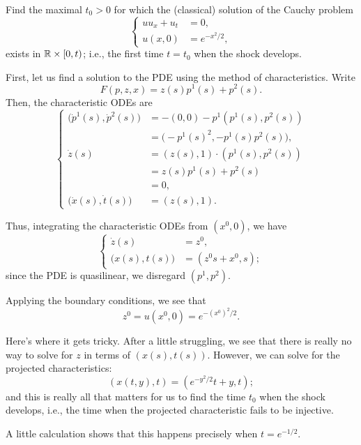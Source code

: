 \begin{problem}
  Find the maximal \(t_0>0\) for which the (classical) solution of the
  Cauchy problem
  \[
    \left\{
      \begin{aligned}
        uu_x+u_t&=0,\\
        u(x,0)&=e^{-x^2/2},
      \end{aligned}
    \right.
  \]
  exists in \(\mathbb{R}\times[0,t)\); i.e., the first time \(t=t_0\) when the
  shock develops.
\end{problem}
\begin{solution*}
  First, let us find a solution to the PDE using the method of
  characteristics. Write
  \[
    F(p,z,x)=z(s)p^1(s)+p^2(s).
  \]
  Then, the characteristic ODEs are
  \[
    \left\{
      \begin{aligned}
        \bigl(\dot p^1(s),\dot p^2(s)\bigr)
        &=-(0,0)-p^1(p^1(s),p^2(s))\\
        &=\bigl(-p^1(s)^2,-p^1(s)p^2(s)\bigr),\\
        \dot z(s)
        &=(z(s),1)\cdot(p^1(s),p^2(s))\\
        &=z(s)p^1(s)+p^2(s)\\
        &=0,\\
        \bigl(\dot x(s),\dot t(s)\bigr)
        &=(z(s),1).
      \end{aligned}
    \right.
  \]

  Thus, integrating the characteristic ODEs from \((x^0,0)\), we have
  \[
    \left\{
      \begin{aligned}
        \dot z(s)
        &=z^0,\\
        \bigl(x(s),t(s)\bigr)
        &=(z^0s+x^0,s);
      \end{aligned}
    \right.
  \]
  since the PDE is quasilinear, we disregard \((p^1,p^2)\).

  Applying the boundary conditions, we see that
  \[
    z^0=u(x^0,0)=e^{-{(x^0)}^2/2}.
  \]

  Here's where it gets tricky. After a little struggling, we see that there
  is really no way to solve for \(z\) in terms of \((x(s),t(s))\). However,
  we can solve for the projected characteristics:
  \[
    (x(t,y),t)=(e^{-y^2/2}t+y,t);
  \]
  and this is really all that matters for us to find the time \(t_0\)  when
  the shock develops, i.e., the time when the projected characteristic
  fails to be injective.

  A little calculation shows that this happens precisely when
  \(t=e^{-1/2}\).
\end{solution*}

